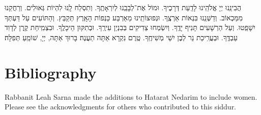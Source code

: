 \documentclass[twoside, openany, parskip=half, 11pt]{book}
\begin{document}

הֲבִינֵֽנוּ יְיָ אֱלֹהֵֽינוּ לָדַֽעַת דְּרָכֶיךָ. וּמוֹל אֶת־לְבָבֵֽנוּ לְיִרְאָתֶֽךָ. וְתִסְלַח לָֽנוּ לִהְיוֹת גְּאוּלִים. וְרַחֲקֵנוּ מִמַּכְאוֹב. וְדַשְּׁנֵֽנוּ בִּנְאוֹת אַרְצֶֽךָ. וּנְפוּצוֹתֵֽינוּ מֵאַרְבַּע כַּנְפוֹת הָאָֽרֶץ תְּקַבֵּץ. וְהַתּוֹעִים עַל דַּעְתְּךָ יִשָׁפֵֽטוּ. וְעַל הַרְשָׁעִים תָּנִיף יָדֶֽךָ. וְיִשְׂמְחוּ צַדִיקִים בְּבִנְיַן עִירֶֽךָ. וּבְתִקּוּן הֵיכָלֶֽךָ. וּבִצְמִֽיחַת קֶֽרֶן לְדָוִד עַבְדֶּֽךָ. וּבְעֲרִֽיכַת נֵר לְבֶן יִשַׁי מְשִׁיחֶֽךָ. טֶֽרֶם נִקְרָא אַתָּה תַעֲנֶה׃ בָּרוּךְ אַתָּה, יְיָ, שׁוֹמֵֽעַ תְּפִלָּה׃

\chapter{Bibliography}

\begin{english}
\nocite{artcant}
\nocite{artscroll}
\nocite{avodasyisroel}
\nocite{birnbaum}
\nocite{korenyt}
\nocite{mapm}
\nocite{olastamid}
\nocite{levshalem}
\nocite{sacks_koren_2016}
\nocite{simshalom}
\nocite{simshalomweekday}
\nocite{tefillatyesharim}
\nocite{birkat_haminim}
\nocite{albeck_kodashim}

\printbibliography
Rabbanit Leah Sarna made the additions to Hatarat Nedarim to include women. Please see the acknowledgments for others who contributed to this siddur.

\end{english}

\end{document}
